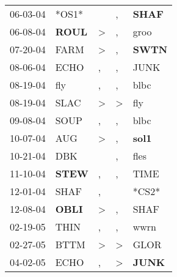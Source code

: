 \begin{supertabular}{p{0.07\textwidth}p{0.06\textwidth}p{0.02\textwidth}p{0.02\textwidth}p{0.06\textwidth}}
          06-03-04\textsuperscript{} &                            *OS1* &                  &             , &  \textbf{SHAF\textsuperscript{}} \\
          06-08-04\textsuperscript{} &  \textbf{ROUL\textsuperscript{}} &     \textgreater &             , &           groo\textsuperscript{} \\
          07-20-04\textsuperscript{} &           FARM\textsuperscript{} &     \textgreater &             , &  \textbf{SWTN\textsuperscript{}} \\
          08-06-04\textsuperscript{} &           ECHO\textsuperscript{} &                , &             , &           JUNK\textsuperscript{} \\
          08-19-04\textsuperscript{} &            fly\textsuperscript{} &                , &             , &           blbc\textsuperscript{} \\
          08-19-04\textsuperscript{} &           SLAC\textsuperscript{} &     \textgreater &  \textgreater &            fly\textsuperscript{} \\
          09-08-04\textsuperscript{} &           SOUP\textsuperscript{} &                , &             , &           blbc\textsuperscript{} \\
          10-07-04\textsuperscript{} &            AUG\textsuperscript{} &     \textgreater &             , &  \textbf{sol1\textsuperscript{}} \\
          10-21-04\textsuperscript{} &            DBK\textsuperscript{} &                  &             , &           fles\textsuperscript{} \\
          11-10-04\textsuperscript{} &  \textbf{STEW\textsuperscript{}} &                , &             , &           TIME\textsuperscript{} \\
          12-01-04\textsuperscript{} &           SHAF\textsuperscript{} &                , &               &                            *CS2* \\
          12-08-04\textsuperscript{} &  \textbf{OBLI\textsuperscript{}} &     \textgreater &             , &           SHAF\textsuperscript{} \\
          02-19-05\textsuperscript{} &           THIN\textsuperscript{} &                , &             , &           wwrn\textsuperscript{} \\
          02-27-05\textsuperscript{} &           BTTM\textsuperscript{} &     \textgreater &  \textgreater &           GLOR\textsuperscript{} \\
          04-02-05\textsuperscript{} &           ECHO\textsuperscript{} &                , &  \textgreater &  \textbf{JUNK\textsuperscript{}} \\

\end{supertabular}
